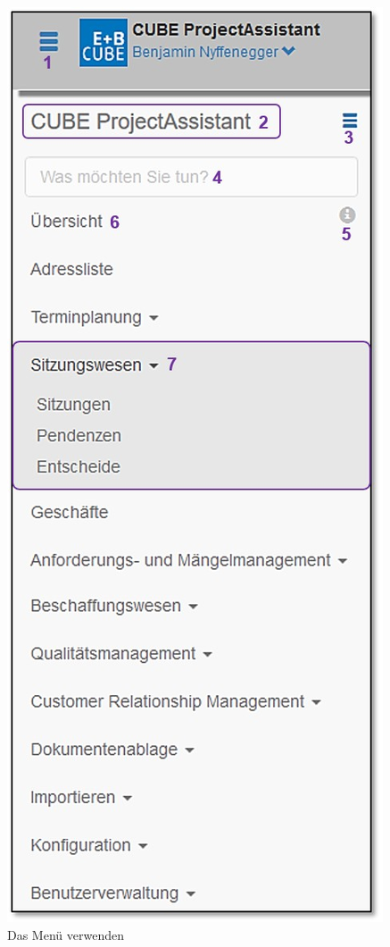 \begin{figure}
\begin{center}
    \includegraphics[width=1\linewidth]{../chapters/02_GettingStarted/pictures/2-5-1_Menu_Uebersicht.jpg}
  \end{center}
  \vspace{-20pt}
  \caption{Das Menü verwenden}
  \vspace{-10pt}
\end{figure}

